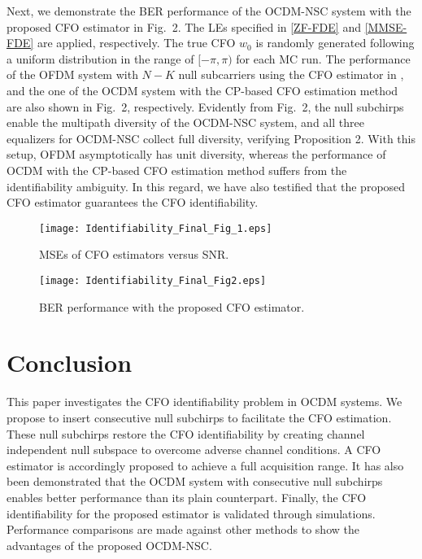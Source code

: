 \documentclass[journal]{IEEEtran}
\begin{document}
\indent Next, we demonstrate the BER performance of the OCDM-NSC system with the proposed CFO estimator in Fig.~2. The LEs specified in \eqref{ZF-FDE} and \eqref{MMSE-FDE} are applied, respectively. The true CFO $w_0$ is randomly generated following a uniform distribution in the range of $[-\pi, \pi)$ for each MC run. The performance of the OFDM system with \(N-K\) null subcarriers using the CFO estimator in \cite{ma_non-data-aided_2001}, and the one of the OCDM system with the CP-based CFO estimation method \cite{zhang_channel_2022} are also shown in Fig.~2, respectively. Evidently from Fig.~2, the null subchirps enable the multipath diversity of the OCDM-NSC system, and all three equalizers for OCDM-NSC collect full diversity, verifying Proposition 2. With this setup, OFDM asymptotically has unit diversity, whereas the performance of OCDM with the CP-based CFO estimation method suffers from the identifiability ambiguity. In this regard, we have also testified that the proposed CFO estimator guarantees the CFO identifiability. 

\begin{figure}
    \centering
    \texttt{[image: Identifiability\_Final\_Fig\_1.eps]}
    \caption{MSEs of CFO estimators versus SNR.}
    \label{fig:2}
\end{figure}


\begin{figure}
    \centering
    \texttt{[image: Identifiability\_Final\_Fig2.eps]}
    \caption{BER performance with the proposed CFO estimator.}
    \label{fig:4}
\end{figure}




\section{Conclusion}
This paper investigates the CFO identifiability problem in OCDM systems. %
We propose to insert consecutive null subchirps to facilitate the CFO estimation.  These null subchirps %
restore the CFO identifiability by creating channel independent null subspace to overcome adverse channel conditions. A CFO estimator is accordingly proposed to achieve a full acquisition range. It has also been demonstrated that the OCDM system with consecutive null subchirps enables better performance than its plain counterpart. Finally, the CFO identifiability for the proposed estimator is validated through simulations. Performance comparisons are made against other methods to show the advantages of the proposed OCDM-NSC. 
\end{document}
